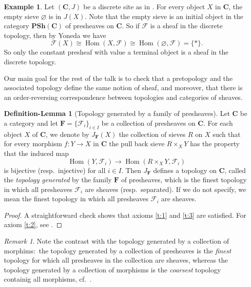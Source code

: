 \documentclass[12pt,reqno,a4paper]{amsart}
\theoremstyle{plain}
\theoremstyle{definition}
\newtheorem{defnlm}[thm]{Definition-Lemma}
\newtheorem{exmp}[thm]{Example}
\theoremstyle{remark}
\newtheorem{rem}[thm]{Remark}
\begin{document}
\begin{exmp}\label{exmp:discretesheaf}
  Let $(\mathbf{C},J)$ be a discrete site as in .
  For every object $X$ in $\mathbf{C}$, the empty sieve $\varnothing$ is in $J(X)$.
  Note that the empty sieve is an initial object in the category $\mathbf{PSh}(\mathbf{C})$ of presheaves on $\mathbf{C}$.
  So if $\mathscr{F}$ is a sheaf in the discrete topology, then by Yoneda we have
  \[ \mathscr{F}(X) \cong \operatorname{Hom}(X,\mathscr{F}) \cong \operatorname{Hom}(\varnothing, \mathscr{F}) = \{ * \}. \]
  So only the constant presheaf with value a terminal object is a sheaf in the discrete topology.
\end{exmp}

Our main goal for the rest of the talk is to check that a pretopology and the associated topology define the same notion of sheaf, and moreover, that there is an order-reversing correspondence between topologies and categories of sheaves.

\begin{defnlm}[Topology generated by a family of presheaves]\label{defnlm:generatedtopology}
  Let $\mathbf{C}$ be a category and let $\mathbf{F} = \{ \mathscr{F}_{i} \}_{i \in I}$ be a collection of presheaves on $\mathbf{C}$.
  For each object $X$ of $\mathbf{C}$, we denote by $J_{\mathbf{F}}(X)$ the collection of sieves $R$ on $X$ such that for every morphism $f \colon Y \to X$ in $\mathbf{C}$ the pull back sieve $R \times_{X} Y$ has the property that the induced map
  \[ \operatorname{Hom}(Y,\mathscr{F}_{i}) \to \operatorname{Hom}(R \times_{X} Y, \mathscr{F}_{i}) \]
  is bijective (resp.~injective) for all $i \in I$.
  Then $J_{\mathbf{F}}$ defines a topology on $\mathbf{C}$, called the \textit{topology generated} by the family $\mathbf{F}$ of presheaves, which is the finest topology in which all presheaves $\mathscr{F}_{i}$ are sheaves (resp.~separated).
  If we do not specify, we mean the finest topology in which all presheaves $\mathscr{F}_{i}$ are sheaves.
  \begin{proof}
    A straightforward check shows that axioms \ref{t:1} and \ref{t:3} are satisfied.
    For axiom \ref{t:2}, see \cite[Exposé II, Proposition 2.2]{sga4}.
  \end{proof}
\end{defnlm}

\begin{rem}
  Note the contrast with the topology generated by a collection of morphims:~the topology generated by a collection of presheaves is the \textit{finest} topology for which all presheaves in the collection are sheaves, whereas the topology generated by a collection of morphisms is the \textit{coarsest} topology containig all morphisms, cf.~.
\end{rem}
\end{document}
